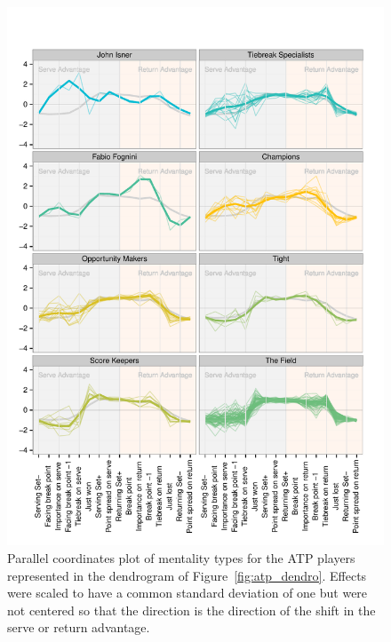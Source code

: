 \documentclass{Latex/svjour3}
\begin{document}
\begin{figure}
\includegraphics[scale=0.9]{figs/atp_coords_std_fixed.pdf}
\caption{Parallel coordinates plot of mentality types for the ATP
  players represented in the dendrogram of
  Figure~\ref{fig:atp_dendro}. Effects were scaled to have a common
  standard deviation of one but were not centered so that the
  direction is the direction of the shift in the
  serve or return advantage.}
\label{fig:atp_coord}
\end{figure}

\clearpage
\end{document}
